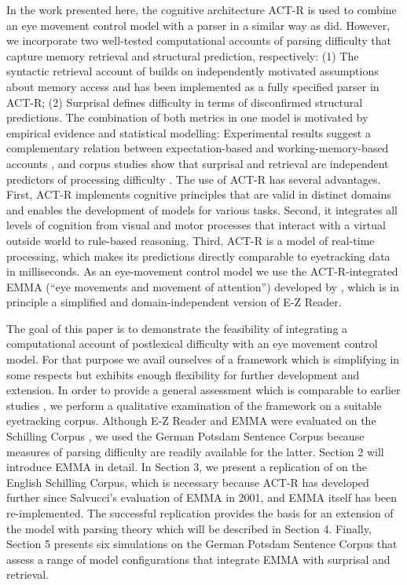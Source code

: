 In the work presented here, the cognitive architecture ACT-R \citep{AndersonEtAl2004} is used to combine an eye movement control model with a parser in a similar way as \cite{ReichleWarrenMcConnell2009} did. However, we incorporate two well-tested computational accounts of parsing difficulty that capture  memory retrieval and  structural prediction, respectively: (1) The syntactic retrieval account of \cite{LewisVasishth2005} builds on independently motivated assumptions about memory access and has been implemented as a fully specified parser in ACT-R; (2) Surprisal \cite{Hale2001,Levy2008} defines difficulty in terms of disconfirmed structural predictions.
The combination of both metrics in one model is motivated by empirical evidence and statistical modelling: Experimental results suggest a complementary relation between expectation-based and working-memory-based accounts \citep{Demberg2008,Konieczny2000,Vasishth2011,Staub2010a}, and corpus studies show that surprisal and retrieval are independent predictors of processing difficulty \citep{Boston2008,BostonHaleVasishth2011,Patil2009,VasishthLewis2006}. 
The use of ACT-R has several advantages. First, ACT-R implements cognitive principles that are valid in distinct domains and enables the development of models for various tasks. Second, it integrates all levels of cognition from visual and motor processes that interact with a virtual outside world to rule-based reasoning.  Third, ACT-R is a model of real-time processing, which makes its predictions directly comparable to eyetracking data in milliseconds.
As an eye-movement control model we use the ACT-R-integrated EMMA   (``eye movements and movement of attention'') developed by \cite{Salvucci2001}, which is in principle a simplified and domain-independent version of E-Z Reader.

The goal of this paper is to demonstrate the feasibility of integrating a computational account of postlexical difficulty with an eye movement control model.  For that purpose we avail ourselves of a framework which is simplifying in some respects but exhibits enough flexibility for further development and extension.  In order to provide a general assessment which is comparable to earlier studies \citep{Reichle1998,ReichleWarrenMcConnell2009,Salvucci2001}, we perform a qualitative examination of the framework on a suitable eyetracking corpus.  Although E-Z Reader and EMMA were evaluated on the Schilling Corpus \cite{Schilling1998}, we used the German Potsdam Sentence Corpus \cite{Kliegl2004} because measures of parsing difficulty are readily available for the latter.
Section 2 will introduce EMMA in detail.  In Section 3, we present a replication of \cite{Salvucci2001} on the English Schilling Corpus, which is necessary because ACT-R has developed further since Salvucci's evaluation of EMMA in 2001, and EMMA itself has been re-implemented.  The successful replication provides the basis for an extension of the model with parsing theory which will be described in Section 4.  Finally, Section 5 presents six simulations on the German Potsdam Sentence Corpus that assess a range of model configurations that integrate EMMA with surprisal and retrieval.

